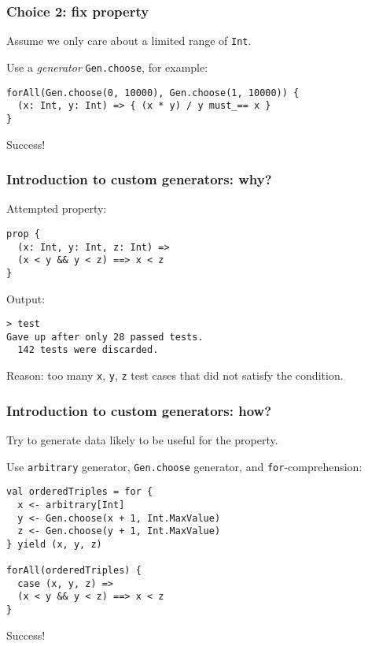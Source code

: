 \begin{frame}[fragile]
  \frametitle{Choice 2: fix property}

  Assume we only care about a limited range of \texttt{Int}.

  Use a \emph{generator} \texttt{Gen.choose}, for example:

  \begin{verbatim}
forAll(Gen.choose(0, 10000), Gen.choose(1, 10000)) {
  (x: Int, y: Int) => { (x * y) / y must_== x }
}
  \end{verbatim}

  Success!
\end{frame}

\begin{frame}[fragile]
  \frametitle{Introduction to custom generators: why?}

  Attempted property:

  \begin{verbatim}
prop {
  (x: Int, y: Int, z: Int) =>
  (x < y && y < z) ==> x < z
}
  \end{verbatim}

  Output:

  \begin{verbatim}
> test
Gave up after only 28 passed tests.
  142 tests were discarded.
  \end{verbatim}

  Reason: too many \texttt{x}, \texttt{y}, \texttt{z} test cases that did not satisfy the condition.
\end{frame}

\begin{frame}[fragile]
  \frametitle{Introduction to custom generators: how?}

  Try to generate data likely to be useful for the property.

  Use \texttt{arbitrary} generator, \texttt{Gen.choose} generator, and \texttt{for}-comprehension:

  \begin{verbatim}
val orderedTriples = for {
  x <- arbitrary[Int]
  y <- Gen.choose(x + 1, Int.MaxValue)
  z <- Gen.choose(y + 1, Int.MaxValue)
} yield (x, y, z)

forAll(orderedTriples) {
  case (x, y, z) =>
  (x < y && y < z) ==> x < z
}
  \end{verbatim}

  Success!
\end{frame}

